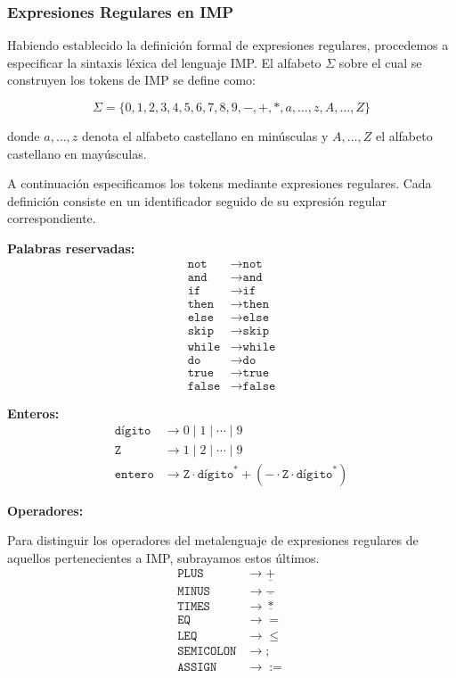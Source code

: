 \documentclass[10pt]{book}
\begin{document}
\subsubsection{Expresiones Regulares en IMP}

Habiendo establecido la definición formal de expresiones regulares, procedemos a especificar la sintaxis léxica del lenguaje IMP. El alfabeto $\Sigma$ sobre el cual se construyen los tokens de IMP se define como:

\[
\Sigma = \{0, 1, 2, 3, 4, 5, 6, 7, 8, 9, -, +, *, a, \ldots, z, A, \ldots, Z\}
\]

donde $a, \ldots, z$ denota el alfabeto castellano en minúsculas y $A, \ldots, Z$ el alfabeto castellano en mayúsculas.

A continuación especificamos los tokens mediante expresiones regulares. Cada definición consiste en un identificador seguido de su expresión regular correspondiente.

\textbf{Palabras reservadas:}
\begin{align*}
\texttt{not} &\to \texttt{not} \\
\texttt{and} &\to \texttt{and} \\
\texttt{if} &\to \texttt{if} \\
\texttt{then} &\to \texttt{then} \\
\texttt{else} &\to \texttt{else} \\
\texttt{skip} &\to \texttt{skip} \\
\texttt{while} &\to \texttt{while} \\
\texttt{do} &\to \texttt{do} \\
\texttt{true} &\to \texttt{true} \\
\texttt{false} &\to \texttt{false}
\end{align*}

\textbf{Enteros:}
\begin{align*}
\texttt{dígito} &\to 0 \mid 1 \mid \cdots \mid 9 \\
\texttt{Z} &\to 1 \mid 2 \mid \cdots \mid 9 \\
\texttt{entero} &\to \texttt{Z} \cdot \texttt{dígito}^* + (- \cdot \texttt{Z} \cdot \texttt{dígito}^*)
\end{align*}

\textbf{Operadores:}

Para distinguir los operadores del metalenguaje de expresiones regulares de aquellos pertenecientes a IMP, subrayamos estos últimos.
\begin{align*}
\texttt{PLUS} &\to \underline{+} \\
\texttt{MINUS} &\to \underline{-} \\
\texttt{TIMES} &\to \underline{*} \\
\texttt{EQ} &\to = \\
\texttt{LEQ} &\to \leq \\
\texttt{SEMICOLON} &\to ; \\
\texttt{ASSIGN} &\to :=
\end{align*}
\end{document}
